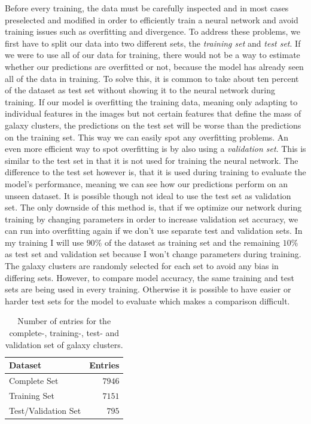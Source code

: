 Before every training, the data must be carefully inspected and in most cases preselected and modified in order to efficiently train a neural network and avoid training issues such as overfitting and divergence.
To address these problems, we first have to split our data into two different sets, the \textit{training set} and \textit{test set}. If we were to use all of our data for training, there would not be a way to estimate whether our predictions are overfitted or not, because the model has already seen all of the data in training. To solve this, it is common to take about ten percent of the dataset as test set without showing it to the neural network during training. If our model is overfitting the training data, meaning only adapting to individual features in the images but not certain features that define the mass of galaxy clusters, the predictions on the test set will be worse than the predictions on the training set. This way we can easily spot any overfitting problems. An even more efficient way to spot overfitting is by also using a \textit{validation set}. This is similar to the test set in that it is not used for training the neural network. The difference to the test set however is, that it is used during training to evaluate the model's performance, meaning we can see how our predictions perform on an unseen dataset. It is possible though not ideal to use the test set as validation set. The only downside of this method is, that if we optimize our network during training by changing parameters in order to increase validation set accuracy, we can run into overfitting again if we don't use separate test and validation sets. In my training I will use $90\%$ of the dataset as training set and the remaining $10\%$ as test set and validation set because I won't change parameters during training. The galaxy clusters are randomly selected for each set to avoid any bias in differing sets. However, to compare model accuracy, the same training and test sets are being used in every training. Otherwise it is possible to have easier or harder test sets for the model to evaluate which makes a comparison difficult.

\begin{table}[h]
\centering
\begin{tabular}{@{}lr@{}}\toprule
\textbf{Dataset} & \textbf{Entries} \\
\midrule
Complete Set & $7946$ \\
Training Set & $7151$ \\
Test/Validation Set & $795$ \\
\bottomrule
\end{tabular}
\caption{Number of entries for the complete-, training-, test- and validation set of galaxy clusters.}
\label{tab:freq_bands}
\end{table}

